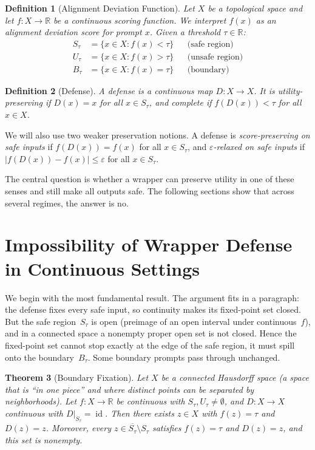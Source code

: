 \documentclass[11pt]{article}
\newtheorem{theorem}{Theorem}[section]
\newtheorem{definition}[theorem]{Definition}
\newcommand{\R}{\mathbb{R}}
\newcommand{\cl}[1]{\overline{#1}}
\newcommand{\id}{\operatorname{id}}
\begin{document}
\begin{definition}[Alignment Deviation Function]
\label{def:ad}
Let $X$ be a topological space and let $f\colon X \to \R$ be a
continuous scoring function. We interpret $f(x)$ as an alignment
deviation score for prompt $x$. Given a threshold $\tau\in\R$:
\begin{align}
  S_\tau &= \{x \in X : f(x) < \tau\}  &&\text{(safe region)} \\
  U_\tau &= \{x \in X : f(x) > \tau\}  &&\text{(unsafe region)} \\
  B_\tau &= \{x \in X : f(x) = \tau\}  &&\text{(boundary)}
\end{align}
\end{definition}

\begin{definition}[Defense]
\label{def:defense}
A \emph{defense} is a continuous map $D\colon X \to X$. It is
\emph{utility-preserving} if $D(x) = x$ for all $x \in S_\tau$, and
\emph{complete} if $f(D(x)) < \tau$ for all $x\in X$.
\end{definition}

We will also use two weaker preservation notions. A defense is
\emph{score-preserving on safe inputs} if $f(D(x)) = f(x)$ for all
$x \in S_\tau$, and \emph{$\varepsilon$-relaxed on safe inputs} if
$|f(D(x)) - f(x)| \leq \varepsilon$ for all $x \in S_\tau$.

The central question is whether a wrapper can preserve utility in one
of these senses and still make all outputs safe. The following sections
show that across several regimes, the answer is no.


\section{Impossibility of Wrapper Defense in Continuous Settings}
\label{sec:boundary}

We begin with the most fundamental result. The argument fits in a
paragraph: the defense fixes every safe input, so continuity makes its
fixed-point set closed. But the safe region~$S_\tau$ is open (preimage
of an open interval under continuous~$f$), and in a connected space a
nonempty proper open set is not closed. Hence the fixed-point set
cannot stop exactly at the edge of the safe region, it must spill onto
the boundary~$B_\tau$. Some boundary prompts pass through unchanged.

\begin{theorem}[Boundary Fixation]
\label{thm:main}
Let $X$ be a connected Hausdorff space (a space that is ``in one
piece'' and where distinct points can be separated by neighborhoods).
Let $f\colon X\to\R$ be continuous with $S_\tau, U_\tau \neq
\emptyset$, and $D\colon X \to X$ continuous with
$D|_{S_\tau} = \id$. Then there exists $z\in X$ with $f(z) = \tau$
and $D(z) = z$. Moreover, every $z \in \cl{S_\tau} \setminus S_\tau$
satisfies $f(z) = \tau$ and $D(z) = z$, and this set is nonempty.
\end{theorem}
\end{document}
